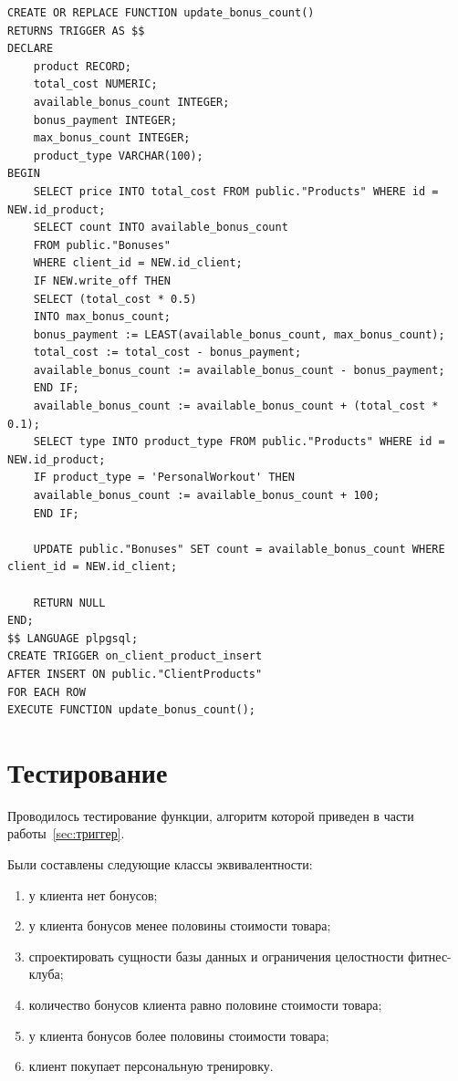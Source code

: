 \clearpage
\begin{center}
	\captionsetup{justification=raggedright,singlelinecheck=off}
	\begin{lstlisting}[label=lst:trigger,caption={Код на SQL для создания триггера и функции}]
CREATE OR REPLACE FUNCTION update_bonus_count()
RETURNS TRIGGER AS $$
DECLARE
	product RECORD;
	total_cost NUMERIC;
	available_bonus_count INTEGER;
	bonus_payment INTEGER;
	max_bonus_count INTEGER;
	product_type VARCHAR(100);
BEGIN
	SELECT price INTO total_cost FROM public."Products" WHERE id = NEW.id_product;
	SELECT count INTO available_bonus_count 
	FROM public."Bonuses" 
	WHERE client_id = NEW.id_client;
	IF NEW.write_off THEN
	SELECT (total_cost * 0.5) 
	INTO max_bonus_count;
	bonus_payment := LEAST(available_bonus_count, max_bonus_count);
	total_cost := total_cost - bonus_payment;
	available_bonus_count := available_bonus_count - bonus_payment;
	END IF;
	available_bonus_count := available_bonus_count + (total_cost * 0.1);
	SELECT type INTO product_type FROM public."Products" WHERE id = NEW.id_product;
	IF product_type = 'PersonalWorkout' THEN
	available_bonus_count := available_bonus_count + 100;
	END IF;

	UPDATE public."Bonuses" SET count = available_bonus_count WHERE client_id = NEW.id_client;
	
	RETURN NULL
END;
$$ LANGUAGE plpgsql;
CREATE TRIGGER on_client_product_insert
AFTER INSERT ON public."ClientProducts"
FOR EACH ROW
EXECUTE FUNCTION update_bonus_count();
	\end{lstlisting}
\end{center}

\section{Тестирование}

Проводилось тестирование функции, алгоритм которой приведен в части работы~\ref{sec:триггер}. 

Были составлены следующие классы эквивалентности:
\begin{enumerate}[label=\arabic*)]
	\item у клиента нет бонусов;
	\item у клиента бонусов менее половины стоимости
	товара;
	\item спроектировать сущности базы данных и ограничения целостности фитнес-клуба;
	\item количество бонусов клиента равно половине
	стоимости товара;
	\item у клиента бонусов более половины стоимости
	товара;
	\item клиент покупает персональную тренировку.
\end{enumerate}

